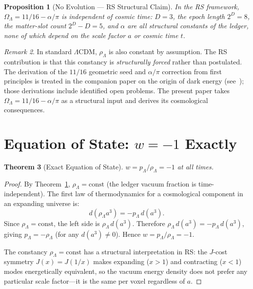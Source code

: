 \documentclass[12pt,a4paper]{article}
\newtheorem{theorem}{Theorem}[section]
\newtheorem{proposition}[theorem]{Proposition}
\theoremstyle{definition}
\theoremstyle{remark}
\newtheorem{remark}[theorem]{Remark}
\begin{document}
\begin{proposition}[No Evolution --- RS Structural Claim]
\label{thm:no-evolution}
In the RS framework, $\Omega_\Lambda = 11/16 - \alpha/\pi$ is independent
of cosmic time: $D = 3$, the epoch length $2^D = 8$, the matter-slot
count $2^D - D = 5$, and $\alpha$ are all structural constants of the
ledger, none of which depend on the scale factor $a$ or cosmic time $t$.
\end{proposition}

\begin{remark}
In standard $\Lambda$CDM, $\rho_\Lambda$ is also constant by assumption.
The RS contribution is that this constancy is \emph{structurally forced}
rather than postulated.  The derivation of the $11/16$ geometric seed
and $\alpha/\pi$ correction from first principles is treated in the
companion paper on the origin of dark energy (see~\cite{RS_Axioms});
those derivations include identified open problems.  The present paper
takes $\Omega_\Lambda = 11/16 - \alpha/\pi$ as a structural input and
derives its cosmological consequences.
\end{remark}

\section{Equation of State: $w = -1$ Exactly}
\label{sec:eos}

\begin{theorem}[Exact Equation of State]
\label{thm:eos}
$w = p_\Lambda/\rho_\Lambda = -1$ at all times.
\end{theorem}

\begin{proof}
By Theorem~\ref{thm:no-evolution}, $\rho_\Lambda = \mathrm{const}$
(the ledger vacuum fraction is time-independent).  The first law
of thermodynamics for a cosmological component in an expanding
universe is:
\begin{equation}
  d(\rho_\Lambda a^3) = -p_\Lambda\,d(a^3).
\end{equation}
Since $\rho_\Lambda = \mathrm{const}$, the left side is
$\rho_\Lambda\,d(a^3)$.  Therefore
$\rho_\Lambda\,d(a^3) = -p_\Lambda\,d(a^3)$, giving
$p_\Lambda = -\rho_\Lambda$ (for any $d(a^3) \neq 0$).  Hence
$w = p_\Lambda/\rho_\Lambda = -1$.

The constancy $\rho_\Lambda = \mathrm{const}$ has a structural
interpretation in RS: the $J$-cost symmetry $J(x) = J(1/x)$
makes expanding ($x > 1$) and contracting ($x < 1$) modes
energetically equivalent, so the vacuum energy density does not
prefer any particular scale factor---it is the same per voxel
regardless of $a$.
\end{proof}
\end{document}
